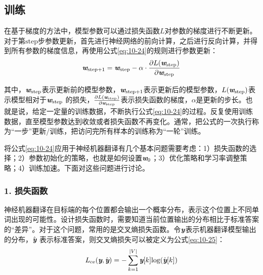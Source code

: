 \subsection{训练}

\parinterval 在基于梯度的方法中，模型参数可以通过损失函数$L$对参数的梯度进行不断更新。对于第$\textrm{step}$步参数更新，首先进行神经网络的前向计算，之后进行反向计算，并得到所有参数的梯度信息，再使用公式\eqref{eq:10-24}的规则进行参数更新：
\begin{eqnarray}
\textbf{\em w}_{\textrm{step}+1} = \textbf{\em w}_{\textrm{step}} - \alpha \cdot \frac{ \partial L(\textbf{\em w}_{\textrm{step}})} {\partial \textbf{\em w}_{\textrm{step}} }
\label{eq:10-24}
\end{eqnarray}

\noindent 其中，$\textbf{\em w}_{\textrm{step}}$表示更新前的模型参数，$\textbf{\em w}_{\textrm{step}+1}$表示更新后的模型参数，$L(\textbf{\em w}_{\textrm{step}})$表示模型相对于$\textbf{\em w}_{\textrm{step}}$ 的损失，$\frac{\partial L(\textbf{\em w}_{\textrm{step}})} {\partial \textbf{\em w}_{\textrm{step}} }$表示损失函数的梯度，$\alpha$是更新的步长。也就是说，给定一定量的训练数据，不断执行公式\eqref{eq:10-24}的过程。反复使用训练数据，直至模型参数达到收敛或者损失函数不再变化。通常，把公式的一次执行称为“一步”更新/训练，把访问完所有样本的训练称为“一轮”训练。

\parinterval 将公式\eqref{eq:10-24}应用于神经机器翻译有几个基本问题需要考虑：1）损失函数的选择；2）参数初始化的策略，也就是如何设置$\textbf{\em w}_0$；3）优化策略和学习率调整策略；4）训练加速。下面对这些问题进行讨论。


\subsubsection{1. 损失函数}

\parinterval 神经机器翻译在目标端的每个位置都会输出一个概率分布，表示这个位置上不同单词出现的可能性。设计损失函数时，需要知道当前位置输出的分布相比于标准答案的“差异”。对于这个问题，常用的是交叉熵损失函数。令$\textbf{\em y}$表示机器翻译模型输出的分布，$\hat{\textbf{\em y}}$ 表示标准答案，则交叉熵损失可以被定义为公式\eqref{eq:10-25}：
\begin{eqnarray}
L_{\textrm{ce}}(\textbf{\em y},\hat{\textbf{\em y}}) = - \sum_{k=1}^{|V|} \textbf{\em y}[k] \textrm{log} (\hat{\textbf{\em y}}[k])
\label{eq:10-25}
\end{eqnarray}

